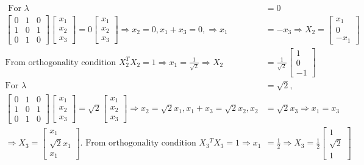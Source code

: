 \begin{enumerate}
\begin{answer}
\begin{align*}
	\text{	For }\lambda&=0\\
		\left[\begin{array}{lll}
		0 & 1 & 0 \\
		1 & 0 & 1 \\
		0 & 1 & 0
		\end{array}\right]\left[\begin{array}{l}
		x_{1} \\
		x_{2} \\
		x_{3}
		\end{array}\right]=0\left[\begin{array}{c}
		x_{1} \\
		x_{2} \\
		x_{3}
		\end{array}\right] \Rightarrow x_{2}=0, x_{1}+x_{3}=0, \Rightarrow x_{1}&=-x_{3} \Rightarrow X_{2}=\left[\begin{array}{c}
		x_{1} \\
		0 \\
		-x_{1}
		\end{array}\right]\\
		\text{From orthogonality condition }X_{2}^{T} X_{2}=1 \Rightarrow x_{1}=\frac{1}{\sqrt{2}} \Rightarrow X_{2}&=\frac{1}{\sqrt{2}}\left[\begin{array}{c}1 \\ 0 \\ -1\end{array}\right]\\
		\text{For }\lambda&=\sqrt{2},\\
		\left[\begin{array}{lll}
		0 & 1 & 0 \\
		1 & 0 & 1 \\
		0 & 1 & 0
		\end{array}\right]\left[\begin{array}{l}
		x_{1} \\
		x_{2} \\
		x_{3}
		\end{array}\right]=\sqrt{2}\left[\begin{array}{l}
		x_{1} \\
		x_{2} \\
		x_{3}
		\end{array}\right] \Rightarrow x_{2}=\sqrt{2} x_{1}, x_{1}+x_{3}=\sqrt{2} x_{2}, x_{2}&=\sqrt{2} x_{3} \Rightarrow x_{1}=x_{3}\\
		\Rightarrow X_{3}=\left[\begin{array}{c}x_{1} \\ \sqrt{2} x_{1} \\ x_{1}\end{array}\right] .\text{ From orthogonality condition }X_{3}{ }^{T} X_{3}=1 \Rightarrow x_{1}&=\frac{1}{2} \Rightarrow X_{3}=\frac{1}{2}\left[\begin{array}{c}1 \\ \sqrt{2} \\ 1\end{array}\right]

\end{align*}
\end{answer}
\end{enumerate}

